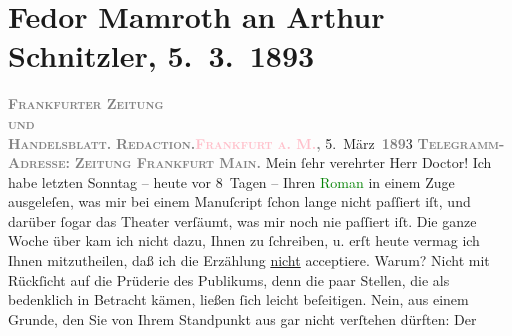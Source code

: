 

               \section[Fedor Mamroth an Arthur Schnitzler, 5. 3. 1893]{ Fedor Mamroth an Arthur Schnitzler, 5. 3. 1893}\nopagebreak{}\rehead{ }\normalsize\beginnumbering{} \toendnotes[C]{\smallbreak\pagebreak[2]} 
\toendnotes[C]{\smallbreak}\pstart
           \noindent{}{\pb}\textcolor{brown}{\textcolor{gray}{\textbf{\textsc{Frankfurter Zeitung}}}{\\}\textsc{\textcolor{gray}{\textbf{und}}}{\\}\textcolor{gray}{\textbf{\textsc{Handelsblatt.}}}}{}\ledrightnote{\textcolor{brown}{Frankfurter Zeitung}}\pend
           \pstart
           \textcolor{gray}{\textbf{\textsc{Redaction.}}}\hfill \textcolor{gray}{\textbf{\textsc{\textcolor{pink}{Frankfurt a. M.}{}\ledrightnote{\textcolor{pink}{Frankfurt am Main}},}}}{ }5. März \textsc{\textcolor{gray}{\textbf{189}}}3\pend
           \pstart
           \textcolor{gray}{\textbf{\textsc{Telegramm-Adresse:}}}\pend
           \pstart
           \textcolor{gray}{\textbf{\textsc{Zeitung Frankfurt Main.}}}\pend
           \pstart{}Mein ſehr verehrter Herr Doctor!\pend\pstart
           Ich habe letzten Sonntag – heute vor 8 Tagen – Ihren \textcolor{green}{Roman}{} in einem Zuge ausgeleſen, was mir bei einem
                    Manuſcript ſchon lange nicht paſſiert iſt, und darüber ſogar das Theater
                    verſäumt, was mir noch nie paſſiert iſt. Die ganze Woche über kam ich nicht
                    dazu, Ihnen zu ſchreiben, u. erſt heute vermag ich Ihnen mitzutheilen, daß ich
                    die Erzählung \uline{nicht} acceptiere.\pend
           \pstart
           Warum? Nicht mit Rückſicht auf die Prüderie des Publikums, denn die paar Stellen,
                    die als bedenklich in Betracht kämen, ließen ſich leicht beſeitigen. Nein, aus
                    einem Grunde, den Sie von Ihrem Standpunkt aus gar nicht verſtehen dürften: Der
